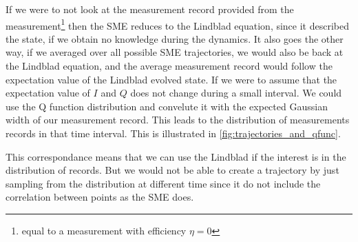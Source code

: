 If we were to not look at the measurement record provided from the measurement\footnote{equal to a measurement with efficiency $\eta = 0$} then the SME reduces to the Lindblad equation, since it described the state, if we obtain no knowledge during the dynamics. It also goes the other way, if we averaged over all possible SME trajectories, we would also be back at the Lindblad equation, and the average measurement record would follow the expectation value of the Lindblad evolved state. If we were to assume that the expectation value of $I$ and $Q$ does not change during a small interval. We could use the Q function distribution and convelute it with the expected Gaussian width of our measurement record. This leads to the distribution of measurements records in that time interval. This is illustrated in \ref{fig:trajectories_and_qfunc}.

This correspondance means that we can use the Lindblad if the interest is in the distribution of records. But we would not be able to create a trajectory by just sampling from the distribution at different time since it do not include the correlation between points as the SME does.








